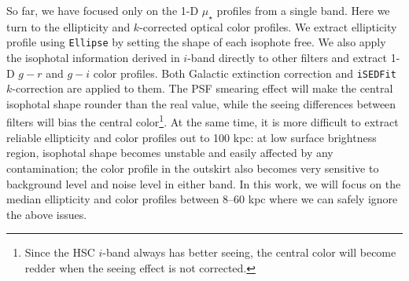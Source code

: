 \documentclass[a4paper,fleqn,usenatbib]{mnras}
\def\mden{{$\mu_{\star}$}}
\begin{document}
    So far, we have focused only on the 1-D \mden{} profiles from a single band.
	Here we turn to the ellipticity and $k$-corrected optical color profiles.
	We extract ellipticity profile using \texttt{Ellipse} by setting the shape of each 
	isophote free. 
	We also apply the isophotal information derived in $i$-band directly to other 
	filters and extract 1-D $g-r$ and $g-i$ color profiles.
	Both Galactic extinction correction and \texttt{iSEDFit} $k$-correction are applied 
	to them.
	The PSF smearing effect will make the central isophotal shape rounder than the 
	real value, while the seeing differences between filters will bias the central 
	color\footnote{Since the HSC $i$-band always has better seeing, the central color 
	will become redder when the seeing effect is not corrected.}. 
	At the same time, it is more difficult to extract reliable ellipticity and 
	color profiles out to 100 kpc: at low surface brightness region, isophotal shape 
	becomes unstable and easily affected by any contamination; the color profile in
	the outskirt also becomes very sensitive to background level and noise level in 
	either band. 
	In this work, we will focus on the median ellipticity and color profiles between 
	8--60 kpc where we can safely ignore the above issues. 
	
\end{document}
